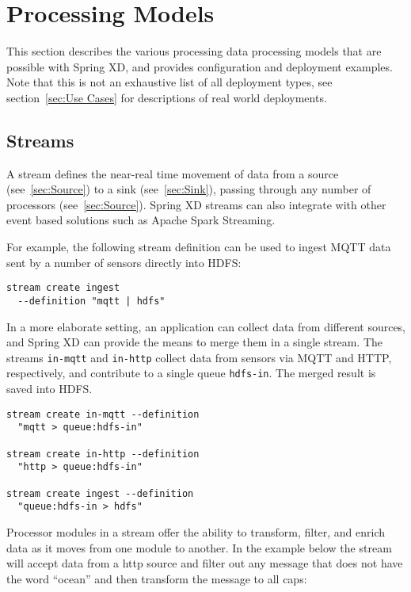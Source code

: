 \section{Processing Models}
This section describes the various processing data processing models that are possible with
Spring XD, and provides configuration and deployment examples.
Note that this is not an exhaustive list of all
deployment types, see section~\ref{sec:Use Cases} for descriptions of real
world deployments.

\subsection {Streams}

A stream defines the near-real time movement of data from a source (see~\ref{sec:Source}) to a
sink (see~\ref{sec:Sink}), passing through any number of processors (see~\ref{sec:Source}).  Spring XD streams can
also integrate with other event based solutions such as Apache Spark Streaming.

For example, the following stream definition can be used to ingest
MQTT\cite{mqtt} data sent by a number of sensors directly into HDFS:

\begin{lstlisting}
stream create ingest
  --definition "mqtt | hdfs"
\end{lstlisting}

In a more elaborate setting, an application can collect data from
different sources, and Spring XD can provide the means to merge them
in a single stream. The streams \texttt{in-mqtt} and \texttt{in-http}
collect data from sensors via MQTT and HTTP, respectively, and
contribute to a single queue \texttt{hdfs-in}. The merged result
is saved into HDFS.

\begin{lstlisting}
stream create in-mqtt --definition
  "mqtt > queue:hdfs-in"

stream create in-http --definition
  "http > queue:hdfs-in"

stream create ingest --definition
  "queue:hdfs-in > hdfs"
\end{lstlisting}

Processor modules in a stream offer the ability to transform, filter,
and enrich data as it moves from one module to another.  In the example below
the stream will accept data from a http source and filter out any message
that does not have the word ``ocean'' and then transform the message
to all caps:

